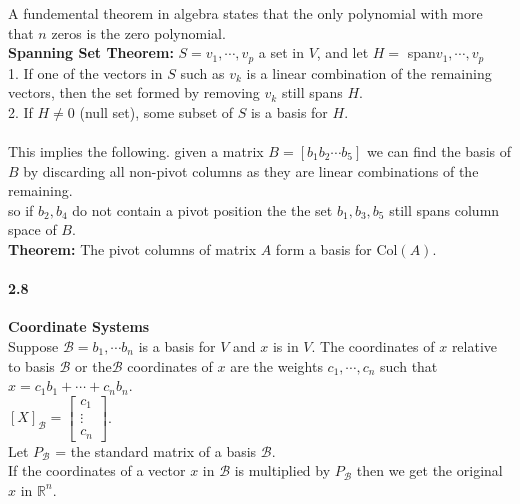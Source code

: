 \documentclass[14pt]{extreport}
\begin{document}
A fundemental theorem in algebra states that the only polynomial with more that $n$ zeros is the zero polynomial.\\

\textbf{Spanning Set Theorem: } $S = {v_1, \cdots, v_p}$ a set in $V$, and let $H =$ span{$v_1, \cdots, v_p$}\\

1. If one of the vectors in $S$ such as $v_k$ is a linear combination of the remaining vectors, then the set formed by removing $v_k$ still spans $H$.\\

2. If $H \ne {0}$ (null set), some subset of $S$ is a basis for $H$.\\\\

This implies the following. given a matrix $B = [b_1 b_2 \cdots b_5]$ we can find the basis of $B$ by discarding all non-pivot columns as they are linear combinations of the remaining.\\
so if $b_2, b_4$ do not contain a pivot position the the set ${b_1, b_3, b_5}$ still spans column space of $B$.\\

\textbf{Theorem: } The pivot columns of matrix $A$ form a basis for Col$(A)$.\\

\paragraph{2.8} \textbf{Coordinate Systems}\\

Suppose $\mathcal{B} = {b_1, \cdots b_n}$ is a basis for $V$ and $x$ is in $V$. The coordinates of $x$ relative to basis $\mathcal{B}$ or the$ \mathcal{B}$ coordinates of $x$ are the weights $c_1, \cdots, c_n$ such that $x= c_1b_1 + \cdots + c_nb_n$.\\

$[X]_{\mathcal{B}} = \begin{bmatrix} c_1 \\ \vdots\\ c_n \end{bmatrix}$.\\

Let $P_{\mathcal{B}}$ = the standard matrix of a basis $\mathcal{B}$.\\
If the coordinates of a vector $x$ in $\mathcal{B}$ is multiplied by $P_{\mathcal{B}}$ then we get the original $x$ in $\mathbb{R}^n$.\\
\end{document}
